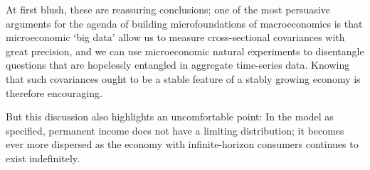 \documentclass[ProjectDLO]{subfiles}
\begin{document}
\begin{comment}
which is the point where $\HarmWide{\cv}_{t}$ is the covariance calculated according to the Harmenberg measure.

As Harmenberg points out, a convenient feature of his measure is that $\Harm{\Mean}_{t+n}[\pLevBF_{t+n}]=\PGro^{n}$.  Using this, if by date $t=0$ the economy had achieved a Harmenberg-invariant state then we could define $\bar{\cRat}=\Harm{\Mean}_{t}[\cRat_ {t}]$ and use the fact that thereafter assets grow at the constant rate $\PGro$ to obtain
  \begin{align}
  \CLevBF_{t+1} & = \PGro \CLevBF_{t}\notag \\ 
  \bar{\cRat}\PGro +\HarmWide{\cv}(\cRat_{t+1},\pLevBF_{t+1})   & = \PGro \left( \bar{\cRat}  +  \HarmWide{\cv}(\cRat_{t},\pLevBF_{t})\right) \label{eq:covProblem} 
\\  \HarmWide{\cv}(\cRat_{t+1},\pLevBF_{t+1})   & = \HarmWide{\cv}(\cRat_{t},\pLevBF_{t})  \notag
\end{align}

A corresponding argument shows that $\cov(\mRat,\pLevBF)$ also grows by $\PGro$.
\end{comment}


\hypertarget{microfounding-macro-needs-ergodicity}{}
At first blush, these are reassuring conclusions; one of the most persuasive arguments for the agenda of building microfoundations of macroeconomics is that microeconomic `big data' allow us to measure cross-sectional covariances with great precision, and we can use microeconomic natural experiments to disentangle questions that are hopelessly entangled in aggregate time-series data.  Knowing that such covariances ought to be a stable feature of a stably growing economy is therefore encouraging.


But this discussion also highlights an uncomfortable point: In the model as specified, permanent income does not have a limiting distribution; it becomes ever more dispersed as the economy with infinite-horizon consumers continues to exist indefinitely.
\end{document}
